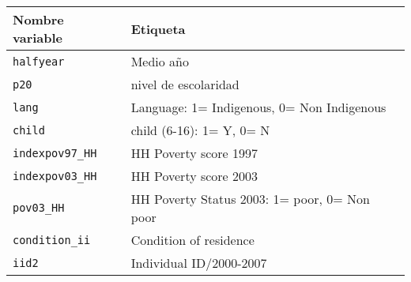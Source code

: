 \documentclass[
]{article}
\begin{document}
\begin{longtable}[]{@{}ll@{}}
\toprule\noalign{}
\textbf{Nombre variable} & \textbf{Etiqueta} \\
\midrule\noalign{}
\endhead
\bottomrule\noalign{}
\endlastfoot
\texttt{halfyear} & Medio año \\
\texttt{p20} & nivel de escolaridad \\
\texttt{lang} & Language: 1= Indigenous, 0= Non Indigenous \\
\texttt{child} & child (6-16): 1= Y, 0= N \\
\texttt{indexpov97\_HH} & HH Poverty score 1997 \\
\texttt{indexpov03\_HH} & HH Poverty score 2003 \\
\texttt{pov03\_HH} & HH Poverty Status 2003: 1= poor, 0= Non poor \\
\texttt{condition\_ii} & Condition of residence \\
\texttt{iid2} & Individual ID/2000-2007 \\
\end{longtable}
\end{document}
